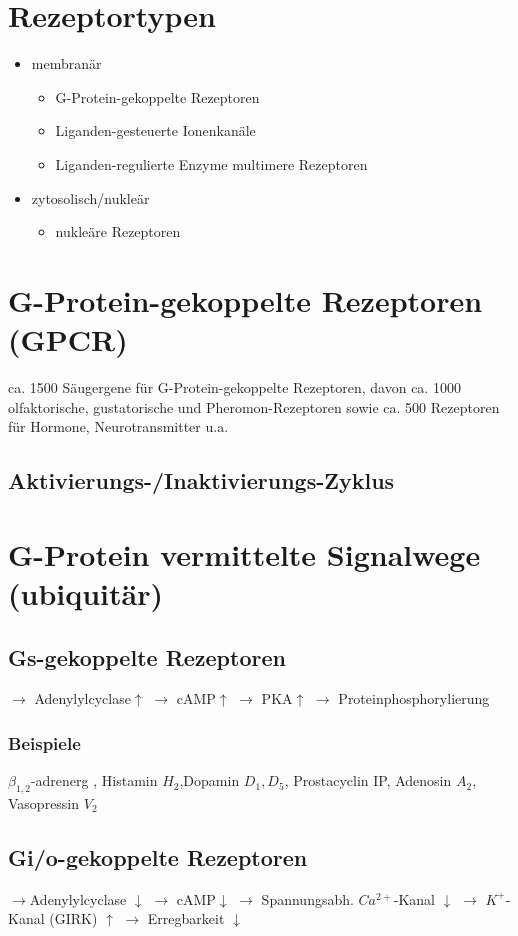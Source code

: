 \documentclass[10pt,a4paper]{report}
\begin{document}
\section{Rezeptortypen}
\begin{itemize}
	\item membranär
	\begin{itemize}
		\item G-Protein-gekoppelte Rezeptoren
		\item Liganden-gesteuerte Ionenkanäle
		\item Liganden-regulierte Enzyme
			multimere Rezeptoren 
	\end{itemize}
	\item zytosolisch/nukleär
	\begin{itemize}
		\item nukleäre Rezeptoren
	\end{itemize}
\end{itemize}
\section{G-Protein-gekoppelte Rezeptoren (GPCR)}
ca. 1500 Säugergene für G-Protein-gekoppelte Rezeptoren, davon ca. 1000 olfaktorische, gustatorische und Pheromon-Rezeptoren sowie ca. 500 Rezeptoren für Hormone, Neurotransmitter u.a.
\subsection{Aktivierungs-/Inaktivierungs-Zyklus}
\section{G-Protein vermittelte Signalwege (ubiquitär)}
\subsection{Gs-gekoppelte Rezeptoren}
$\rightarrow$ Adenylylcyclase$\uparrow$ $\rightarrow$ cAMP$\uparrow$ $\rightarrow$ PKA$\uparrow$ $\rightarrow$ Proteinphosphorylierung
\subsubsection{Beispiele}
$\beta_{1,2}$-adrenerg	, Histamin $H_2$,Dopamin $D_1,D_5$, Prostacyclin IP, Adenosin $A_2$, Vasopressin $V_2$
\subsection{Gi/o-gekoppelte Rezeptoren}
$\rightarrow$Adenylylcyclase $\downarrow$ $\rightarrow$ cAMP$\downarrow$
$\rightarrow$ Spannungsabh. $Ca^{2+}$-Kanal $\downarrow$ 
$\rightarrow$ $K^+$-Kanal (GIRK) $\uparrow$
$\rightarrow$ Erregbarkeit $\downarrow$
\end{document}
